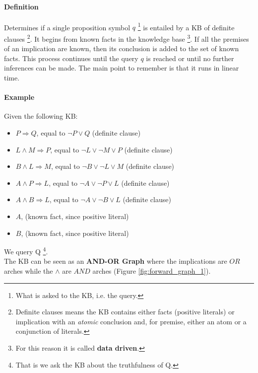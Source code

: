 \documentclass[10pt,a4paper]{article}
\begin{document}
\paragraph{Definition}
Determines if a single proposition symbol $q$ \footnote{What is asked to the KB, i.e. the query.} is entailed by a KB of definite clauses \footnote{Definite clauses means the KB contains either facts (positive literals) or implication with an \textit{atomic} conclusion and, for premise, either an atom or a conjunction of literals. }. It begins from known facts in the knowledge base \footnote{For this reason it is called \textbf{data driven}.}. If all the premises of an implication are known, then its conclusion is added to the set of known facts. This process continues until the query $q$ is reached or until no further inferences can be made. The main point to remember is that it runs in linear time.

\paragraph{Example}
Given the following KB:
\begin{itemize}
\item $P \Rightarrow Q$, equal to $\neg P \vee Q$ (definite clause)
\item $L \wedge M \Rightarrow P$, equal to $\neg L \vee \neg M \vee P$ (definite clause)
\item $B \wedge L \Rightarrow M$, equal to $\neg B \vee \neg L \vee M$ (definite clause)
\item $A \wedge P \Rightarrow L$, equal to $\neg A \vee \neg P \vee L$ (definite clause)
\item $A \wedge B \Rightarrow L$, equal to $\neg A \vee \neg B \vee L$ (definite clause)
\item $A$, (known fact, since positive literal)
\item $B$, (known fact, since positive literal)
\end{itemize}
We query Q \footnote{That is we ask the KB about the truthfulness of Q.}.\\
 The KB can be seen as an \textbf{AND-OR Graph} where the implications are $OR$ arches while the $\wedge$ are $AND$ arches (Figure \ref{fig:forward_graph_1}).\\
\end{document}
